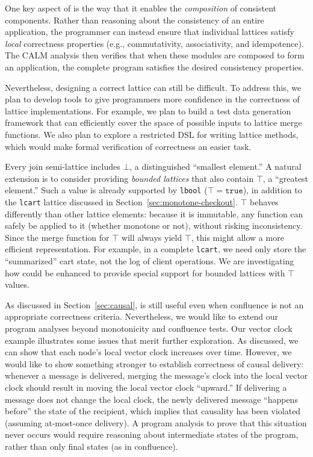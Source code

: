 One key aspect of \lang is the way that it enables the \emph{composition} of consistent components. Rather than reasoning about the consistency of an
entire application, the programmer can instead ensure that individual lattices
satisfy \emph{local} correctness properties (e.g., commutativity, associativity,
and idempotence). The CALM analysis then verifies that when these modules are
composed to form an application, the complete program satisfies the desired
consistency properties.

Nevertheless, designing a correct lattice can still be difficult. To address
this, we plan to develop tools to give programmers more confidence in the
correctness of lattice implementations. For example, we plan to build a test
data generation framework that can efficiently cover the space of possible
inputs to lattice merge functions. We also plan to explore a restricted DSL for
writing lattice methods, which would make formal verification of correctness an
easier task.

Every join semi-lattice includes $\bot$, a distinguished ``smallest element.'' A natural
extension is to consider providing \emph{bounded lattices} that also contain   $\top$, a ``greatest
element.'' Such a value is already supported by \texttt{lbool} ($\top =
\mathtt{true}$), in addition to the \texttt{lcart} lattice discussed in
Section~\ref{sec:monotone-checkout}. $\top$ behaves differently than other
lattice elements: because it is immutable, any function can safely be applied to
it (whether monotone or not), without risking inconsistency. Since the merge
function for $\top$ will always yield $\top$, this might allow a more efficient
representation.  For example, in a complete \texttt{lcart}, we need only store the
``summarized'' cart state, not the log of client operations. We are
investigating how \lang could be enhanced to provide special support for
bounded lattices with $\top$ values.

As discussed in Section~\ref{sec:causal}, \lang is still useful even when
confluence is not an appropriate correctness criteria. Nevertheless, we would like to extend our \lang program analyses beyond monotonicity and confluence tests.  Our vector clock example illustrates some issues that merit further exploration.  As discussed, we can show that each node's local vector clock increases over
time. However, we would like to show something stronger to establish correctness of
causal delivery: whenever a message is delivered, merging the message's clock
into the local vector clock should result in moving the local vector clock
``upward.'' If delivering a message does not change the local clock, the newly
delivered message ``happens before'' the state of the recipient, which implies
that causality has been violated (assuming at-most-once delivery). A program
analysis to prove that this situation never occurs would require reasoning about
intermediate states of the program, rather than only final states (as in
confluence).  

